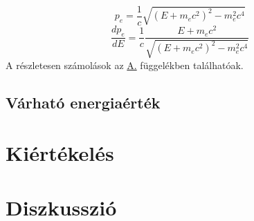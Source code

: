 \begin{multicols}{2}
\begin{equation}
p_{e}
=
\frac{1}{c} \sqrt{\left( E + m_{e} c^2 \right)^2 - m_{e}^{2} c^{4}}
\end{equation}
\begin{equation}
\frac{dp_{e}}{dE}
=
\frac{1}{c} \frac{E + m_{e} c^2}{\sqrt{\left( E + m_{e} c^2 \right)^2 - m_{e}^{2} c^{4}}}
\end{equation}
A részletesen számolások az \hyperref[appendix:A]{A.} függelékben találhatóak.

\subsection{Várható energiaérték}

\section{Kiértékelés}


\section{Diszkusszió}


\end{multicols}